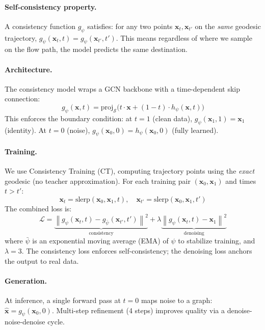 \documentclass[10pt, twocolumn]{article}
\begin{document}
\paragraph{Self-consistency property.}
A consistency function $g_\psi$ satisfies: for any two points $\mathbf{x}_t, \mathbf{x}_{t'}$ on the \emph{same} geodesic trajectory, $g_\psi(\mathbf{x}_t, t) = g_\psi(\mathbf{x}_{t'}, t')$. This means regardless of where we sample on the flow path, the model predicts the same destination.

\paragraph{Architecture.}
The consistency model wraps a GCN backbone with a time-dependent skip connection:
\begin{equation}
    g_\psi(\mathbf{x}, t) = \text{proj}_{\mathcal{S}}\!\big(t \cdot \mathbf{x} + (1{-}t) \cdot h_\psi(\mathbf{x}, t)\big)
\end{equation}
This enforces the boundary condition: at $t{=}1$ (clean data), $g_\psi(\mathbf{x}_1, 1) = \mathbf{x}_1$ (identity). At $t{=}0$ (noise), $g_\psi(\mathbf{x}_0, 0) = h_\psi(\mathbf{x}_0, 0)$ (fully learned).

\paragraph{Training.}
We use Consistency Training (CT), computing trajectory points using the \emph{exact} geodesic (no teacher approximation). For each training pair $(\mathbf{x}_0, \mathbf{x}_1)$ and times $t > t'$:
\begin{equation}
    \mathbf{x}_t = \text{slerp}(\mathbf{x}_0, \mathbf{x}_1, t), \quad \mathbf{x}_{t'} = \text{slerp}(\mathbf{x}_0, \mathbf{x}_1, t')
\end{equation}
The combined loss is:
\begin{equation}
    \mathcal{L} = \underbrace{\left\| g_\psi(\mathbf{x}_t, t) - g_{\bar\psi}(\mathbf{x}_{t'}, t') \right\|^2}_{\text{consistency}} + \lambda \underbrace{\left\| g_\psi(\mathbf{x}_t, t) - \mathbf{x}_1 \right\|^2}_{\text{denoising}}
\end{equation}
where $\bar\psi$ is an exponential moving average (EMA) of $\psi$ to stabilize training, and $\lambda = 3$. The consistency loss enforces self-consistency; the denoising loss anchors the output to real data.

\paragraph{Generation.}
At inference, a single forward pass at $t{=}0$ maps noise to a graph: $\hat{\mathbf{x}} = g_\psi(\mathbf{x}_0, 0)$. Multi-step refinement (4 steps) improves quality via a denoise-noise-denoise cycle.
\end{document}
